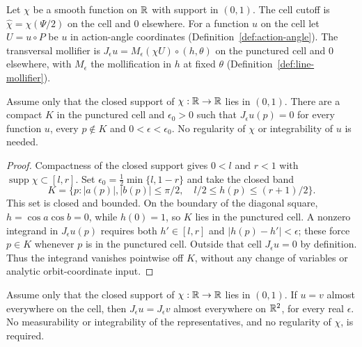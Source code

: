 \begin{definition}
\label{def:transversal-mollifier}
\leanok
Let $\chi$ be a smooth function on $\mathbb{R}$ with support in $(0,1)$. The cell cutoff is
$\hat\chi=\chi(\Psi/2)$ on the cell and $0$ elsewhere. For a function $u$ on the cell let
$U=u\circ P$ be $u$ in action-angle coordinates (Definition~\ref{def:action-angle}). The
transversal mollifier is $J_\epsilon u=M_\epsilon(\chi U)\circ(h,\theta)$ on the punctured cell and $0$
elsewhere, with $M_\epsilon$ the mollification in $h$ at fixed $\theta$
(Definition~\ref{def:line-mollifier}).
\end{definition}

\begin{lemma}
\label{lem:transversal-mollifier-support}
\leanok
Assume only that the closed support of $\chi:\mathbb{R}\to\mathbb{R}$ lies in $(0,1)$.
There are a compact $K$ in the punctured cell and $\epsilon_0>0$ such that
$J_\epsilon u(p)=0$ for every function $u$, every $p\notin K$ and
$0<\epsilon<\epsilon_0$. No regularity of $\chi$ or integrability of $u$
is needed.
\end{lemma}

\begin{proof}
\leanok
Compactness of the closed support gives $0<l$ and $r<1$ with
$\operatorname{supp}\chi\subset[l,r]$. Set
$\epsilon_0=\frac12\min\{l,1-r\}$ and take the closed band
\[
  K=\{p: |a(p)|,|b(p)|\le\pi/2,\quad l/2\le h(p)\le(r+1)/2\}.
\]
This set is closed and bounded. On the boundary of the diagonal square,
$h=\cos a\cos b=0$, while $h(0)=1$, so $K$ lies in the punctured cell.
A nonzero integrand in $J_\epsilon u(p)$ requires both
$h'\in[l,r]$ and $|h(p)-h'|<\epsilon$; these force $p\in K$ whenever
$p$ is in the punctured cell. Outside that cell $J_\epsilon u=0$ by definition.
Thus the integrand vanishes pointwise off $K$, without any change of variables
or analytic orbit-coordinate input.
\end{proof}

\begin{lemma}
\label{lem:transversal-mollifier-congr}
\leanok
Assume only that the closed support of $\chi:\mathbb{R}\to\mathbb{R}$ lies in $(0,1)$.
If $u=v$ almost everywhere on the cell, then $J_\epsilon u=J_\epsilon v$
almost everywhere on $\mathbb{R}^2$, for every real $\epsilon$.
No measurability or integrability of the representatives, and no regularity
of $\chi$, is required.
\end{lemma}

